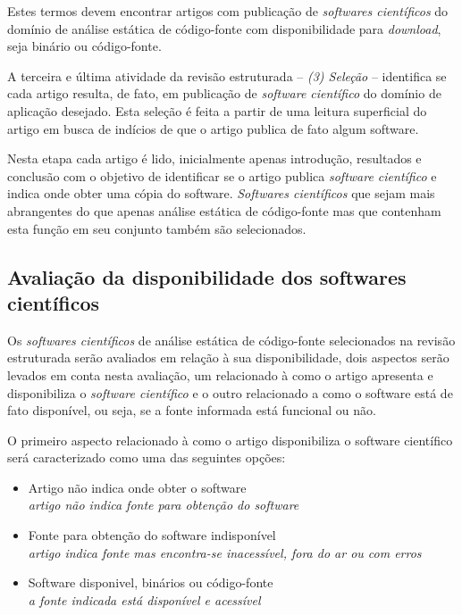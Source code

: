 Estes termos devem encontrar artigos com publicação de {\it softwares
científicos} do domínio de análise estática de código-fonte com disponibilidade
para {\it download}, seja binário ou código-fonte.

A terceira e última atividade da revisão estruturada -- {\it (3) Seleção} --
identifica se cada artigo resulta, de fato, em publicação de {\it
software científico} do domínio de aplicação desejado. Esta seleção é feita a
partir de uma leitura superficial do artigo em busca de indícios de que o
artigo publica de fato algum software.

Nesta etapa cada artigo é lido, inicialmente apenas introdução, resultados e
conclusão com o objetivo de identificar se o artigo publica {\it software
científico} e indica onde obter uma cópia do software. {\it Softwares
científicos} que sejam mais abrangentes do que apenas análise estática de
código-fonte mas que contenham esta função em seu conjunto também são
selecionados.

\subsection{Avaliação da disponibilidade dos softwares científicos}

Os {\it softwares científicos} de análise estática de código-fonte selecionados
na revisão estruturada serão avaliados em relação à sua disponibilidade,
dois aspectos serão levados em conta nesta avaliação, um relacionado à como o
artigo apresenta e disponibiliza o {\it software científico} e
o outro relacionado a como o software está de fato disponível, ou seja, se a fonte
informada está funcional ou não.

O primeiro aspecto relacionado à como o artigo disponibiliza o software
científico será caracterizado como uma das seguintes opções:



\begin{itemize}
  \item Artigo não indica onde obter o software\\
    {\it \small artigo não indica fonte para obtenção do software}
  \item Fonte para obtenção do software indisponível\\
    {\it \small artigo indica fonte mas encontra-se inacessível, fora do ar ou com erros}
  \item Software disponivel, binários ou código-fonte\\
    {\it \small a fonte indicada está disponível e acessível}
\end{itemize}

